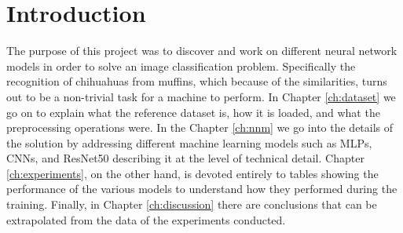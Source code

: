 \chapter{Introduction} \label{ch:introduction}
The purpose of this project was to discover and work on different neural network models in order to solve an image classification problem. Specifically the recognition of chihuahuas from muffins, which because of the similarities, turns out to be a non-trivial task for a machine to perform.
In Chapter \ref{ch:dataset} we go on to explain what the reference dataset is, how it is loaded, and what the preprocessing operations were. In the Chapter \ref{ch:nnm} we go into the details of the solution by addressing different machine learning models such as MLPs, CNNs, and ResNet50 describing it at the level of technical detail. Chapter \ref{ch:experiments}, on the other hand, is devoted entirely to tables showing the performance of the various models to understand how they performed during the training. Finally, in Chapter \ref{ch:discussion} there are conclusions that can be extrapolated from the data of the experiments conducted.

